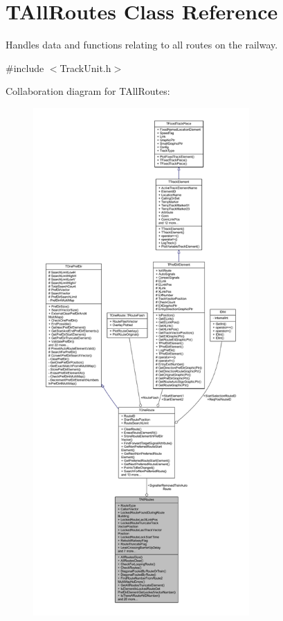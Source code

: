 \hypertarget{class_t_all_routes}{}\section{T\+All\+Routes Class Reference}
\label{class_t_all_routes}


Handles data and functions relating to all routes on the railway.  




{\ttfamily \#include $<$Track\+Unit.\+h$>$}



Collaboration diagram for T\+All\+Routes\+:\nopagebreak
\begin{figure}[H]
\begin{center}
\leavevmode
\includegraphics[height=550pt]{class_t_all_routes__coll__graph}
\end{center}
\end{figure}
